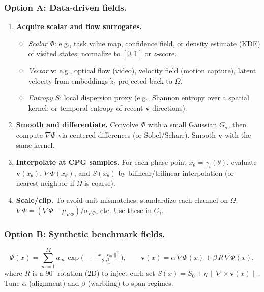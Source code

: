 \documentclass[a4paper,11pt]{article}
\begin{document}
\subsubsection{Option A: Data-driven fields.}
\begin{enumerate}
\item \textbf{Acquire scalar and flow surrogates.}
    \begin{itemize}
        \item \emph{Scalar} $\Phi$: e.g., task value map, confidence field, or density estimate (KDE) of visited states; normalize to $[0,1]$ or $z$-score.
        \item \emph{Vector} $\mathbf v$: e.g., optical flow (video), velocity field (motion capture), latent velocity from embeddings $\dot z_t$ projected back to $\Omega$.
        \item \emph{Entropy} $S$: local dispersion proxy (e.g., Shannon entropy over a spatial kernel; or temporal entropy of recent \(\mathbf v\) directions).
    \end{itemize}
\item \textbf{Smooth and differentiate.} Convolve $\Phi$ with a small Gaussian $G_\sigma$, then compute $\nabla\Phi$ via centered differences (or Sobel/Scharr). Smooth $\mathbf v$ with the same kernel.
\item \textbf{Interpolate at CPG samples.} For each phase point $x_\theta=\gamma_i(\theta)$, evaluate $\mathbf v(x_\theta)$, $\nabla\Phi(x_\theta)$, and $S(x_\theta)$ by bilinear/trilinear interpolation (or nearest-neighbor if $\Omega$ is coarse).
\item \textbf{Scale/clip.} To avoid unit mismatches, standardize each channel on $\Omega$: $\widetilde{\nabla\Phi}=(\nabla\Phi-\mu_{\nabla\Phi})/\sigma_{\nabla\Phi}$, etc. Use these in $G_i$.
\end{enumerate}

\subsubsection{Option B: Synthetic benchmark fields.}
\begin{equation}
\Phi(x)=\sum_{m=1}^M a_m\,\exp\!\big(-\tfrac{\|x-c_m\|^2}{2\sigma_m^2}\big),\qquad
\mathbf v(x)=\alpha\,\nabla\Phi(x)+\beta\,R\,\nabla\Phi(x),
\end{equation}
where $R$ is a $90^\circ$ rotation (2D) to inject curl; set $S(x)=S_0+\eta\,\|\nabla\times\mathbf v(x)\|$.
Tune $\alpha$ (alignment) and $\beta$ (warbling) to span regimes.
\end{document}
